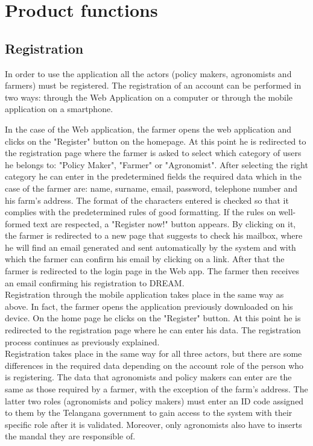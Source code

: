 \section{Product functions}

\subsection{Registration}
In order to use the application all the actors (policy makers, agronomists and farmers) must be registered. The registration of an account can be performed in two ways: through the Web Application on a computer or through the mobile application on a smartphone.

In the case of the Web application, the farmer opens the web application and clicks on the "Register" button on the homepage. At this point he is redirected to the registration page where the farmer is asked to select which category of users he belongs to: "Policy Maker", "Farmer" or "Agronomist".
After selecting the right category he can enter in the predetermined fields the required data which in the case of the farmer are: name, surname, email, password, telephone number and his farm's address. The format of the characters entered is checked so that it complies with the predetermined rules of good formatting. 
If the rules on well-formed text are respected, a "Register now!" button appears. By clicking on it, the farmer is redirected to a new page that suggests to check his mailbox, where he will find an email generated and sent automatically by the system and with which the farmer can confirm his email by clicking on a link. After that the farmer is redirected to the login page in the Web app. The farmer then receives an email confirming his registration to DREAM.\\

Registration through the mobile application takes place in the same way as above. In fact, the farmer opens the application previously downloaded on his device. On the home page he clicks on the "Register" button. At this point he is redirected to the registration page where he can enter his data. The registration process continues as previously explained.\\

Registration takes place in the same way for all three actors, but there are some differences in the required data depending on the account role of the person who is registering. The data that agronomists and policy makers can enter are the same as those required by a farmer, with the exception of the farm's address.
The latter two roles (agronomists and policy makers) must enter an ID code assigned to them by the Telangana government to gain access to the system with their specific role after it is validated.
Moreover, only agronomists also have to inserts the mandal they are responsible of.


